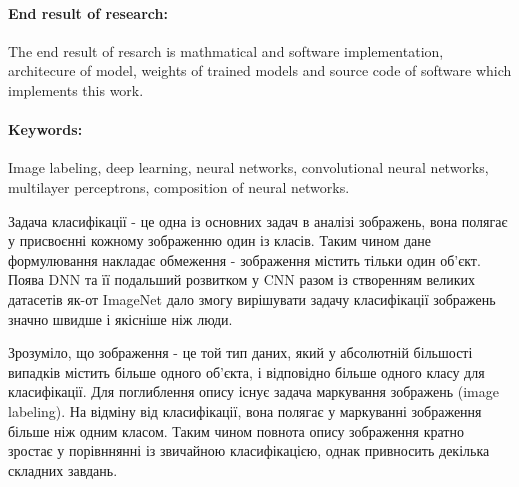 \documentclass{udstu}
\begin{document}
\paragraph{\textbf{End result of research:}}
The end result of resarch is mathmatical and software implementation, architecure of model,
weights of trained models and source code of software which implements this work.

\paragraph{\textbf{Keywords:}}
Image labeling, deep learning, neural networks, convolutional neural networks,
multilayer perceptrons, composition of neural networks.


\tableofcontents

\shortings

\begin{sortedlist}
\end{sortedlist}



Задача класифікації - це одна із основних задач в аналізі зображень, вона полягає
у присвоєнні кожному зображенню один із класів. Таким чином дане формулювання накладає
обмеження - зображення містить тільки один об'єкт. Поява DNN \cite{dnn-cls}
та її подальший розвитком у CNN \cite{cnn-cls-1,cnn-cls-2} разом із створенням
великих датасетів як-от ImageNet \cite{deng2009imagenet} дало змогу вирішувати задачу
класифікації зображень значно швидше і якісніше ніж люди.

Зрозуміло, що зображення - це той тип даних, який у абсолютній більшості випадків містить більше одного об'єкта,
і відповідно більше одного класу для класифікації.
Для поглиблення опису існує задача маркування зображень (image labeling).
На відміну від класифікації, вона полягає у маркуванні зображення більше ніж одним класом.
Таким чином повнота опису зображення кратно зростає у порівннянні із звичайною класифікацією,
однак привносить декілька складних завдань.
\end{document}
